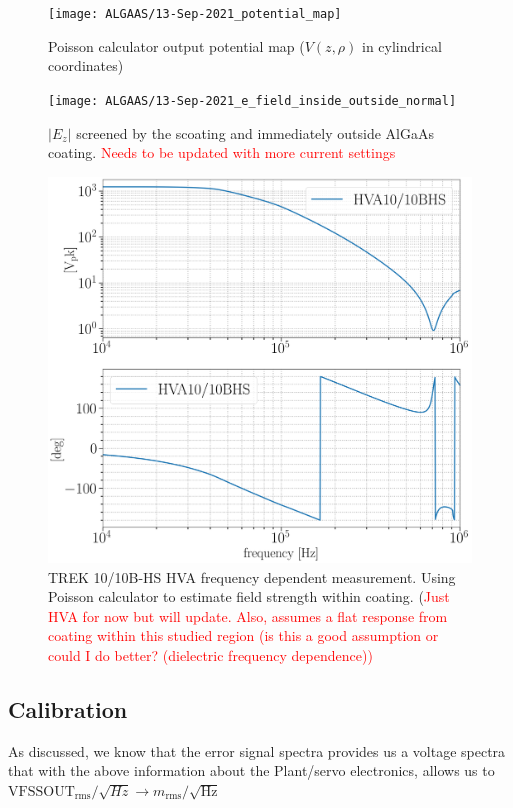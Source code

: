 \begin{figure}[H]
\texttt{[image: ALGAAS/13-Sep-2021\_potential\_map]}
\caption{Poisson calculator output potential map ($V(z,\rho)$ in cylindrical coordinates)}
\label{fig:poisson_calc_output}
\end{figure}

\begin{figure}[H]
\texttt{[image: ALGAAS/13-Sep-2021\_e\_field\_inside\_outside\_normal]}
\caption{$|E_z|$ screened by the scoating and immediately outside AlGaAs coating. \textcolor{red}{Needs to be updated with more current settings}}


\label{fig:Ez}
\end{figure}

\begin{figure}[H]
\centering
\includegraphics[width=.75\textwidth]{figs/ALGAAS/HVA_TREK1010BHS_1260V_out.png}
\caption{TREK 10/10B-HS HVA frequency dependent measurement. Using Poisson calculator to estimate field strength within coating. (\textcolor{red}{Just HVA for now but will update.} \textcolor{red}{Also, assumes a flat response from coating within this studied region (is this a good assumption or could I do better? (dielectric frequency dependence))}}
\label{fig:Ez}
\end{figure}

\subsection{Calibration}
As discussed, we know that the error signal spectra provides us a voltage spectra that with the above information about the Plant/servo electronics, allows us to
$\mathrm{VFSSOUT}_\mathrm{rms}/\sqrt{Hz} \rightarrow m_\mathrm{rms}/\sqrt{\mathrm{Hz}}$

